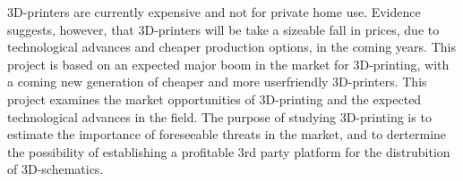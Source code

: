 3D-printers are currently expensive and not for private home use. Evidence suggests, however, that 3D-printers will be take a sizeable fall in prices, due to technological advances and cheaper production options, in the coming years.
This project is based on an expected major boom in the market for 3D-printing, with a coming new generation of cheaper and more userfriendly 3D-printers.
This project examines the market opportunities of 3D-printing and the expected technological advances in the field.
The purpose of studying 3D-printing is to estimate the importance of foreseeable threats in the market, and to dertermine the possibility of establishing a profitable 3rd party platform for the distrubition of 3D-schematics.
